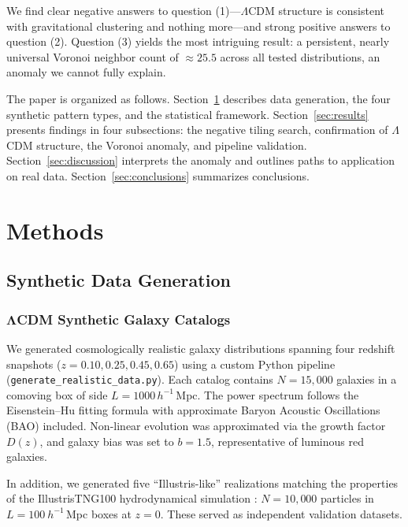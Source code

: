 \documentclass[12pt,a4paper]{article}
\begin{document}
We find clear negative answers to question (1)---$\Lambda$CDM structure is
consistent with gravitational clustering and nothing more---and strong positive
answers to question (2).  Question (3) yields the most intriguing result: a
persistent, nearly universal Voronoi neighbor count of $\approx 25.5$ across all
tested distributions, an anomaly we cannot fully explain.

The paper is organized as follows.  Section~\ref{sec:methods} describes data
generation, the four synthetic pattern types, and the statistical framework.
Section~\ref{sec:results} presents findings in four subsections: the negative
tiling search, confirmation of $\Lambda$CDM structure, the Voronoi anomaly, and
pipeline validation.  Section~\ref{sec:discussion} interprets the anomaly and
outlines paths to application on real data.  Section~\ref{sec:conclusions}
summarizes conclusions.

\section{Methods}
\label{sec:methods}

\subsection{Synthetic Data Generation}
\label{sec:data}

\subsubsection{ΛCDM Synthetic Galaxy Catalogs}

We generated cosmologically realistic galaxy distributions spanning four
redshift snapshots ($z = 0.10, 0.25, 0.45, 0.65$) using a custom Python
pipeline (\texttt{generate\-\_realistic\-\_data.py}).  Each catalog contains
$N = 15{,}000$ galaxies in a comoving box of side $L = 1000\,h^{-1}$\,Mpc.
The power spectrum follows the Eisenstein--Hu fitting formula
\citep{eisenstein1998baryonic} with approximate Baryon Acoustic Oscillations
(BAO) included.  Non-linear evolution was approximated via the growth
factor $D(z)$, and galaxy bias was set to $b = 1.5$, representative of
luminous red galaxies.

In addition, we generated five ``Illustris-like'' realizations matching the
properties of the IllustrisTNG100 hydrodynamical simulation
\citep{springel2018first}: $N = 10{,}000$ particles in $L = 100\ h^{-1}$\,Mpc
boxes at $z = 0$.  These served as independent validation datasets.
\end{document}
